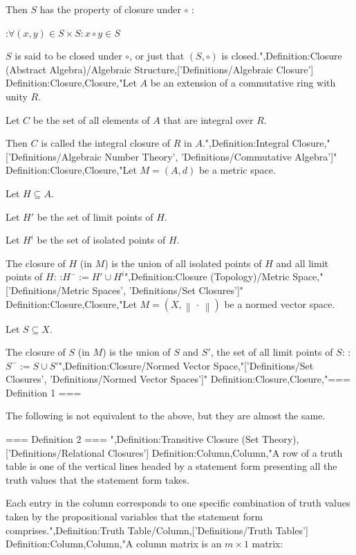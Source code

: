 Then $S$ has the property of closure under $\circ$ :

:$\forall \left( x, y \right) \in S \times S: x \circ y \in S$


$S$ is said to be closed under $\circ$, or just that $\left( S, \circ \right)$ is closed.",Definition:Closure (Abstract Algebra)/Algebraic Structure,['Definitions/Algebraic Closure']
Definition:Closure,Closure,"Let $A$ be an extension of a commutative ring with unity $R$.


Let $C$ be the set of all elements of $A$ that are integral over $R$.

Then $C$ is called the integral closure of $R$ in $A$.",Definition:Integral Closure,"['Definitions/Algebraic Number Theory', 'Definitions/Commutative Algebra']"
Definition:Closure,Closure,"Let $M = \left( A, d \right)$ be a metric space.

Let $H \subseteq A$.

Let $H'$ be the set of limit points of $H$.

Let $H^i$ be the set of isolated points of $H$.


The closure of $H$ (in $M$) is the union of all isolated points of $H$ and all limit points of $H$:
:$H^- := H' \cup H^i$",Definition:Closure (Topology)/Metric Space,"['Definitions/Metric Spaces', 'Definitions/Set Closures']"
Definition:Closure,Closure,"Let $M = \left( X, \left\lVert \, \cdot \, \right\rVert  \right)$ be a normed vector space.

Let $S \subseteq X$.


The closure of $S$ (in $M$) is the union of $S$ and $S'$, the set of all limit points of $S$:
:$S^- := S \cup S'$",Definition:Closure/Normed Vector Space,"['Definitions/Set Closures', 'Definitions/Normed Vector Spaces']"
Definition:Closure,Closure,"=== Definition 1 ===


The following is not equivalent to the above, but they are almost the same.

=== Definition 2 ===
",Definition:Transitive Closure (Set Theory),['Definitions/Relational Closures']
Definition:Column,Column,"A row of a truth table is one of the vertical lines headed by a statement form presenting all the truth values that the statement form takes.

Each entry in the column corresponds to one specific combination of truth values taken by the propositional variables that the statement form comprises.",Definition:Truth Table/Column,['Definitions/Truth Tables']
Definition:Column,Column,"A column matrix is an $m \times 1$ matrix:

